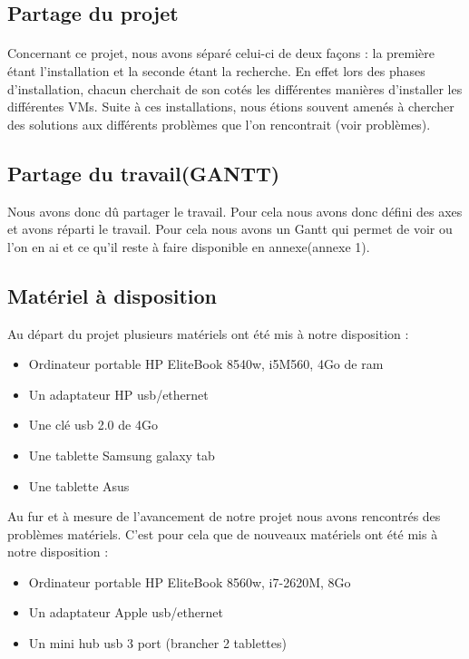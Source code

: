 \documentclass[a4paper,12pt]{extarticle}
\begin{document}
\subsection{Partage du projet}

\paragraph{}
Concernant ce projet, nous avons séparé celui-ci de deux façons : la première étant l’installation et la seconde étant la recherche. En effet lors des phases d’installation, 
chacun cherchait de son cotés les différentes manières d’installer les différentes VMs. Suite à ces installations, nous étions souvent amenés à chercher des solutions aux différents problèmes que l’on rencontrait (voir problèmes).

\subsection{Partage du travail(GANTT)}

Nous avons donc dû partager le travail. Pour cela nous avons donc défini des axes et avons réparti le travail. Pour cela nous avons un Gantt qui permet de voir ou l’on en ai et ce qu’il reste à faire disponible en annexe(annexe 1).\\

\subsection{Matériel à disposition}

Au départ du projet plusieurs matériels ont été mis à notre disposition :
\begin{itemize}
\item Ordinateur portable HP EliteBook 8540w, i5M560, 4Go de ram
\item Un adaptateur HP usb/ethernet
\item Une clé usb 2.0 de 4Go
\item Une tablette Samsung galaxy tab
\item Une tablette Asus\\
\end{itemize}

Au fur et à mesure de l’avancement de notre projet nous avons rencontrés des problèmes matériels. C’est pour cela que de nouveaux matériels ont été mis à notre disposition :
\begin{itemize}
\item Ordinateur portable HP EliteBook 8560w, i7-2620M, 8Go
\item Un adaptateur Apple usb/ethernet
\item Un mini hub usb 3 port (brancher 2 tablettes)
\end{itemize}
\end{document}
